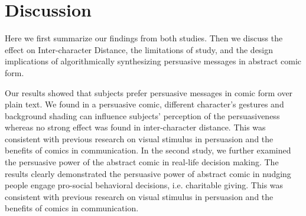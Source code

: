 \section{Discussion}
\label{sec:Discussion}
Here we first summarize our findings from both studies. Then we discuss the effect on Inter-character Distance, the limitations of study, and the design implications of algorithmically synthesizing persuasive messages in abstract comic form.


Our results showed that subjects prefer persuasive messages in comic form over plain text. We found in a persuasive comic, different character's gestures and background shading can influence subjects' perception of the persuasiveness whereas no strong effect was found in inter-character distance. This was consistent with previous research on visual stimulus in persuasion and the benefits of comics in communication. In the second study, we further examined the persuasive power of the abstract comic in real-life decision making. The results clearly demonstrated the persuasive power of abstract comic in nudging people engage pro-social behavioral decisions, i.e. charitable giving. This was consistent with previous research on visual stimulus in persuasion and the benefits of comics in communication.

%
